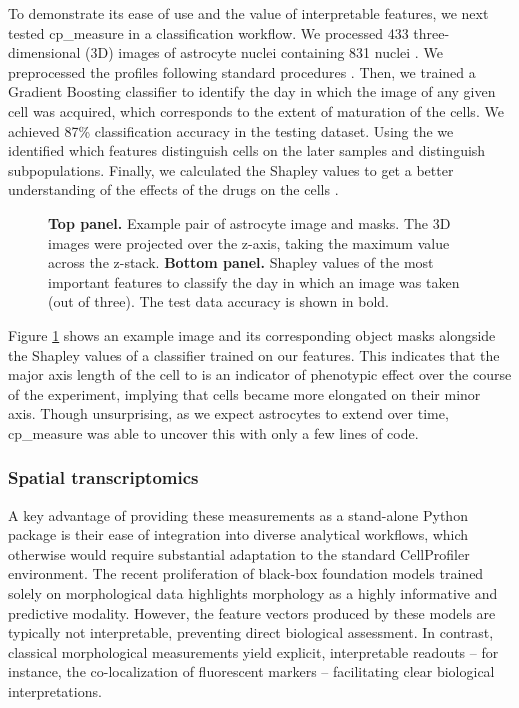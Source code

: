 \documentclass{article}
\begin{document}
To demonstrate its ease of use and the value of interpretable features, we next tested cp\_measure in a classification workflow. We processed 433 three-dimensional (3D) images of astrocyte nuclei containing 831 nuclei \citep{kalinin3DCellNuclear2018}. We preprocessed the profiles following standard procedures \citep{caicedoDataanalysisStrategiesImagebased2017}. Then, we trained a Gradient Boosting classifier to identify the day in which the image of any given cell was acquired, which corresponds to the extent of maturation of the cells. We achieved 87\% classification accuracy in the testing dataset. Using the  we identified which features distinguish cells on the later samples and distinguish subpopulations. Finally, we calculated the Shapley values to get a better understanding of the effects of the drugs on the cells \citep{sundararajanManyShapleyValues2020}.

\begin{figure}[htbp]
\centering

\caption{\label{fig:astrocytes}\textbf{Top panel.} Example pair of astrocyte image and masks. The 3D images were projected over the z-axis, taking the maximum value across the z-stack. \textbf{Bottom panel.} Shapley values of the most important features to classify the day in which an image was taken (out of three). The test data accuracy is shown in bold.}
\end{figure}

Figure \ref{fig:astrocytes} shows an example image and its corresponding object masks alongside the Shapley values of a classifier trained on our features. This indicates that the major axis length of the cell to is an indicator of phenotypic effect over the course of the experiment, implying that cells became more elongated on their minor axis. Though unsurprising, as we expect astrocytes to extend over time, cp\_measure was able to uncover this with only a few lines of code.
\subsubsection{Spatial transcriptomics}
\label{sec:org5711d86}
A key advantage of providing these measurements as a stand-alone Python package is their ease of integration into diverse analytical workflows, which otherwise would require substantial adaptation to the standard CellProfiler environment. The recent proliferation of black-box foundation models trained solely on morphological data highlights morphology as a highly informative and predictive modality. However, the feature vectors produced by these models are typically not interpretable, preventing direct biological assessment. In contrast, classical morphological measurements yield explicit, interpretable readouts -- for instance, the co-localization of fluorescent markers -- facilitating clear biological interpretations.
\end{document}

